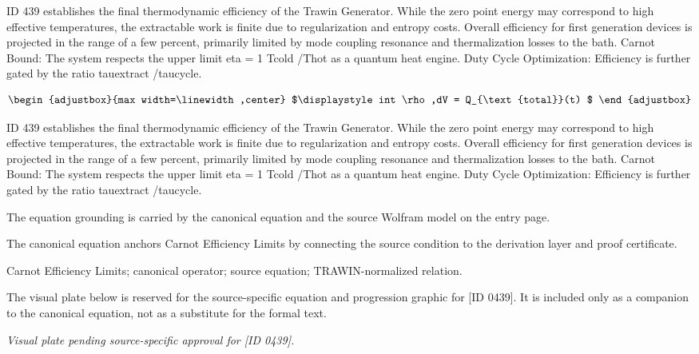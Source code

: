 ID 439 establishes the final thermodynamic efficiency of the Trawin Generator. While the zero point energy may correspond to high effective temperatures, the extractable work is finite due to regularization and entropy costs. Overall efficiency for first generation devices is projected in the range of a few percent, primarily limited by mode coupling resonance and thermalization losses to the bath. Carnot Bound: The system respects the upper limit eta = 1 Tcold /Thot as a quantum heat engine. Duty Cycle Optimization: Efficiency is further gated by the ratio tauextract /taucycle.

\[
\begin{adjustbox}{max width=\linewidth,center}
$\displaystyle
int \rho,dV = Q_{\text{total}}(t)
$
\end{adjustbox}
\]

ID 439 establishes the final thermodynamic efficiency of the Trawin Generator. While the zero point energy may correspond to high effective temperatures, the extractable work is finite due to regularization and entropy costs. Overall efficiency for first generation devices is projected in the range of a few percent, primarily limited by mode coupling resonance and thermalization losses to the bath. Carnot Bound: The system respects the upper limit eta = 1 Tcold /Thot as a quantum heat engine. Duty Cycle Optimization: Efficiency is further gated by the ratio tauextract /taucycle.

The equation grounding is carried by the canonical equation and the source Wolfram model on the entry page.

The canonical equation anchors Carnot Efficiency Limits by connecting the source condition to the derivation layer and proof certificate.

Carnot Efficiency Limits; canonical operator; source equation; TRAWIN-normalized relation.
\endgroup

\begingroup\footnotesize\sloppy
The visual plate below is reserved for the source-specific equation and progression graphic for [ID 0439]. It is included only as a companion to the canonical equation, not as a substitute for the formal text.
\par\endgroup
\begingroup\footnotesize\itshape
Visual plate pending source-specific approval for [ID 0439].
\par\endgroup

